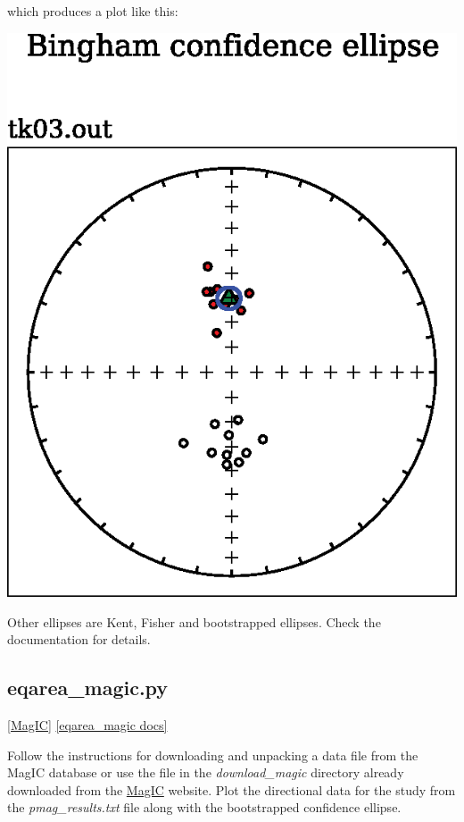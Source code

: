\documentclass[11pt]{book}
\begin{document}
{{{which produces a plot like this:

\includegraphics[width=12 cm]{EPSfiles/eqarea_ell.eps}

Other ellipses are Kent, Fisher and bootstrapped ellipses.  Check the documentation for details.

\subsection{eqarea\_magic.py} \href{#MagIC}{[MagIC]}
\href{http://earthref.org/PmagPy/pmagpydocs/eqarea_magic-module.html}{[eqarea\_magic docs]}

Follow the instructions for downloading and unpacking a data file from the MagIC database or use the file in the {\it download\_magic} directory already downloaded from the  \href{http://earthref.org/MagIC/search}{MagIC} website.    Plot the directional data for the study from the {\it pmag\_results.txt} file along with the bootstrapped 
 confidence ellipse.   

}}}
\end{document}
